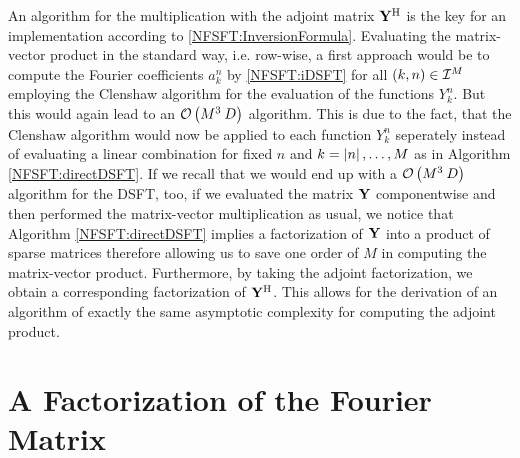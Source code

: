 An algorithm for the multiplication with the adjoint matrix $\mathbf{Y}^{\text{\rm{H}}}$ is the key for an implementation according to \eqref{NFSFT:InversionFormula}. Evaluating the matrix-vector product in the standard way, i.e. row-wise, a first approach would be to compute the Fourier coefficients $a_{k}^n$ by \eqref{NFSFT:iDSFT} for all $\left(k,n\right) \in \mathcal{I}^M$ employing the Clenshaw algorithm for the evaluation of the functions $Y_{k}^n$. But this would again lead to an $\mathcal{O}\left(M^3 \: D\right)$ algorithm. This is due to the fact, that the Clenshaw algorithm would now be applied to each function $Y_{k}^n$ seperately instead of evaluating a linear combination for fixed $n$ and $k = \left\vert n\right\vert,\dots,M$ as in Algorithm \ref{NFSFT:directDSFT}. If we recall that we would end up with a $\mathcal{O}\left(M^3 \: D\right)$ algorithm for the DSFT, too, if we evaluated the matrix $\mathbf{Y}$ componentwise and then performed the matrix-vector multiplication as usual, we notice that Algorithm \ref{NFSFT:directDSFT} implies a factorization of $\mathbf{Y}$ into a product of sparse matrices therefore allowing us to save one order of $M$ in computing the matrix-vector product. Furthermore, by taking the adjoint factorization, we obtain a corresponding factorization of $\mathbf{Y}^{\text{\rm{H}}}$. This allows for the derivation of an algorithm of exactly the same asymptotic complexity for computing the adjoint product.

\section{A Factorization of the Fourier Matrix}

